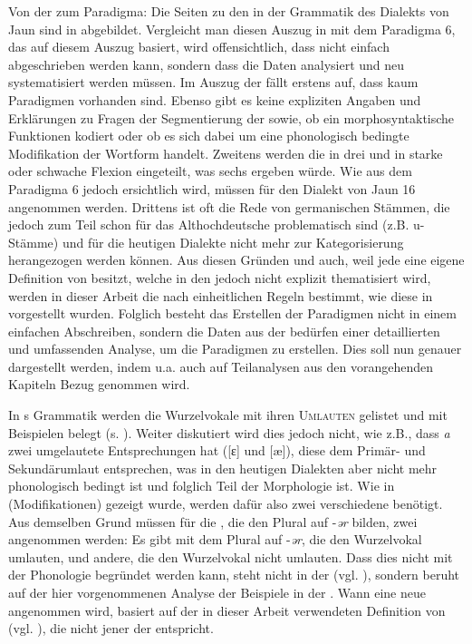 {Von der  zum Paradigma:} Die Seiten zu den  in der Grammatik des Dialekts von Jaun \citep{Stucki1917} sind in \citet{Stucki2011} abgebildet. Vergleicht man diesen Auszug in \citet{Stucki2011} mit dem Paradigma 6, das auf diesem Auszug basiert, wird offensichtlich, dass nicht einfach abgeschrieben werden kann, sondern dass die Daten analysiert und neu systematisiert werden müssen. Im Auszug der  fällt erstens auf, dass kaum Paradigmen vorhanden sind. Ebenso gibt es keine expliziten Angaben und Erklärungen zu Fragen der Segmentierung der  sowie, ob ein  morphosyntaktische Funktionen kodiert oder ob es sich dabei um eine phonologisch bedingte Modifikation der Wortform handelt. Zweitens werden die  in drei  und in starke oder schwache Flexion eingeteilt, was sechs  ergeben würde. Wie aus dem Paradigma 6 jedoch ersichtlich wird, müssen für den Dialekt von Jaun 16  angenommen werden. Drittens ist oft die Rede von germanischen Stämmen, die jedoch zum Teil schon für das Althochdeutsche problematisch sind (z.B. u-Stämme) und für die heutigen Dialekte nicht mehr zur Kategorisierung herangezogen werden können. Aus diesen Gründen und auch, weil jede  eine eigene Definition von  besitzt, welche in den  jedoch nicht explizit thematisiert wird, werden in dieser Arbeit die  nach einheitlichen Regeln bestimmt, wie diese in  vorgestellt wurden. Folglich besteht das Erstellen der Paradigmen nicht in einem einfachen Abschreiben, sondern die Daten aus der  bedürfen einer detaillierten und umfassenden Analyse, um die Paradigmen zu erstellen. Dies soll nun genauer dargestellt werden, indem u.a. auch auf Teilanalysen aus den vorangehenden Kapiteln Bezug genommen wird.

In \citeauthor{Stucki1917}s \citeyearpar{Stucki1917} Grammatik werden die Wurzelvokale mit ihren \textsc{Umlauten} gelistet und mit Beispielen belegt (s. \citealt[§200c]{Stucki2011}). Weiter diskutiert wird dies jedoch nicht, wie z.B., dass \textit{a} zwei umgelautete Entsprechungen hat ([ɛ] und [æ]), diese dem Primär- und Sekundärumlaut entsprechen, was in den heutigen Dialekten aber nicht mehr phonologisch bedingt ist und folglich Teil der Morphologie ist. Wie in  (Modifikationen) gezeigt wurde, werden dafür also zwei verschiedene  benötigt. Aus demselben Grund müssen für die , die den Plural auf -\textit{ər} bilden, zwei  angenommen werden: Es gibt  mit dem Plural auf -\textit{ər}, die den Wurzelvokal umlauten, und andere, die den Wurzelvokal nicht umlauten. Dass dies nicht mit der Phonologie begründet werden kann, steht nicht in der  (vgl. \citealt[§205.2]{Stucki2011}), sondern beruht auf der hier vorgenommenen Analyse der Beispiele in der . Wann eine neue  angenommen wird, basiert auf der in dieser Arbeit verwendeten Definition von  (vgl. ), die nicht jener der  entspricht.

